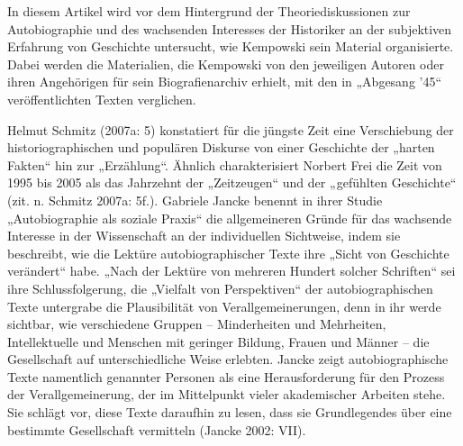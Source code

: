 \begin{multicols*}{2}
In diesem Artikel wird vor dem Hintergrund der Theoriediskussionen zur Autobiographie und des wachsenden Interesses der Historiker an der subjektiven Erfahrung von Geschichte untersucht, wie Kempowski sein Material organisierte. Dabei werden die Materialien, die Kempowski von den jeweiligen Autoren oder ihren Angehörigen für sein Biografienarchiv erhielt, mit den in „Abgesang ’45“ veröffentlichten Texten verglichen.

Helmut Schmitz (2007a: 5) konstatiert für die jüngste Zeit eine Verschiebung der historiographischen und populären Diskurse von einer Geschichte der „harten Fakten“ hin zur „Erzählung“. Ähnlich charakterisiert Norbert Frei die Zeit von 1995 bis 2005 als das Jahrzehnt der „Zeitzeugen“ und der „gefühlten Geschichte“ (zit. n. Schmitz 2007a: 5f.). Gabriele Jancke benennt in ihrer Studie „Autobiographie als soziale Praxis“ die allgemeineren Gründe für das wachsende Interesse in der Wissenschaft an der individuellen Sichtweise, indem sie beschreibt, wie die Lektüre autobiographischer Texte ihre „Sicht von Geschichte verändert“ habe. „Nach der Lektüre von mehreren Hundert solcher Schriften“ sei ihre Schlussfolgerung, die „Vielfalt von Perspektiven“ der autobiographischen Texte untergrabe die Plausibilität von Verallgemeinerungen, denn in ihr werde sichtbar, wie verschiedene Gruppen – Minderheiten und Mehrheiten, Intellektuelle und Menschen mit geringer Bildung, Frauen und Männer – die Gesellschaft auf unterschiedliche Weise erlebten. Jancke zeigt autobiographische Texte namentlich genannter Personen als eine Herausforderung für den Prozess der Verallgemeinerung, der im Mittelpunkt vieler akademischer Arbeiten stehe. Sie schlägt vor, diese Texte daraufhin zu lesen, dass sie Grundlegendes über eine bestimmte Gesellschaft vermitteln (Jancke 2002: VII).


\end{multicols*}
